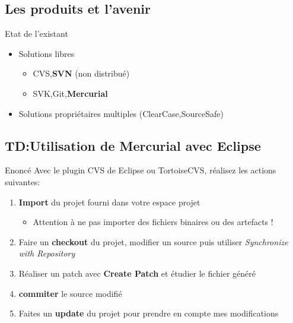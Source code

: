 \documentclass[handout]{beamer}
\begin{document}
\subsection{Les produits et l'avenir}
\begin{frame}
	\begin{block}{Etat de l'existant}
		\begin{itemize}
			\item Solutions libres 
			\begin{itemize}
				\item CVS,\textbf{SVN} (non distribué)
				\item SVK,Git,\textbf{Mercurial}
			\end{itemize}
			\item Solutions propriétaires multiples (ClearCase,SourceSafe)
		\end{itemize}
	\end{block}
\end{frame}


\subsection{TD:Utilisation de Mercurial avec Eclipse}
\begin{frame}
	\begin{block}{Enoncé}
		Avec le plugin CVS de Eclipse ou TortoiseCVS, réalisez les actions suivantes:
		\begin{enumerate}
			\item \textbf{Import} du projet fourni dans votre espace projet
			\begin{itemize}
				\item Attention à ne pas importer des fichiers binaires ou des artefacts !
			\end{itemize}
			\item Faire un \textbf{checkout} du projet, modifier un source puis utiliser \textit{Synchronize with Repository}
			\item Réaliser un patch avec \textbf{Create Patch} et étudier le fichier généré
			\item \textbf{commiter} le source modifié
			\item Faites un \textbf{update} du projet pour prendre en compte mes modifications
		\end{enumerate}
	\end{block}
\end{frame}
\end{document}
